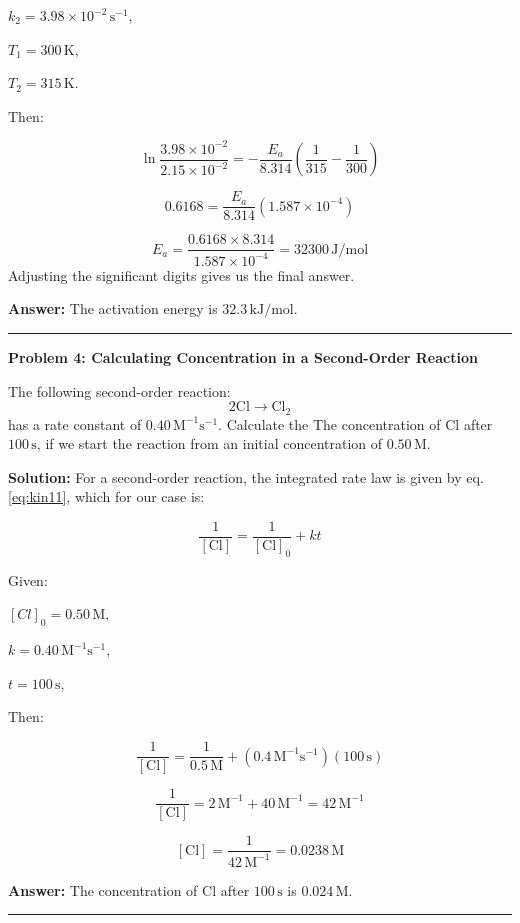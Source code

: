 \documentclass[
  9pt,
]{extbook}
\theoremstyle{definition}
\theoremstyle{definition}
\theoremstyle{definition}
\theoremstyle{remark}
\begin{document}
\(k_2 = 3.98 \times 10^{-2}\,\text{s}^{-1}\),

\(T_1 = 300\,\text{K}\),

\(T_2 = 315\,\text{K}\).

Then:

\[\ln \frac{3.98 \times 10^{-2}}{2.15 \times 10^{-2}} = -\frac{E_a}{8.314}\left(\frac{1}{315} - \frac{1}{300}\right)\]

\[0.6168 = \frac{E_a}{8.314}(1.587 \times 10^{-4})\]

\[E_a = \frac{0.6168 \times 8.314}{1.587 \times 10^{-4}} = 32300\,\text{J/mol}\]
Adjusting the significant digits gives us the final answer.

\textbf{Answer:} The activation energy is \(32.3\,\text{kJ/mol}\).

\begin{center}\rule{0.5\linewidth}{0.5pt}\end{center}

\textbf{Problem 4: Calculating Concentration in a Second-Order Reaction}

The following second-order reaction:
\[2\text{Cl} \rightarrow \text{Cl}_2\]
has a rate constant of \(0.40\,\text{M}^{-1}\text{s}^{-1}\). Calculate the The concentration of \(\text{Cl}\) after \(100\,\text{s}\), if we start the reaction from an initial concentration of \(0.50\,\text{M}\).

\textbf{Solution:} For a second-order reaction, the integrated rate law is given by eq. \eqref{eq:kin11}, which for our case is:

\[\frac{1}{[\text{Cl}]} = \frac{1}{[\text{Cl}]_0} + kt\]

Given:

\([Cl]_0 = 0.50\,\text{M}\),

\(k = 0.40\,\text{M}^{-1}\text{s}^{-1}\),

\(t = 100\,\text{s}\),

Then:

\[\frac{1}{[\text{Cl}]} = \frac{1}{0.5\,\text{M}} + (0.4\,\text{M}^{-1}\text{s}^{-1})(100\,\text{s})\]

\[\frac{1}{[\text{Cl}]} = 2\,\text{M}^{-1} + 40\,\text{M}^{-1} = 42\,\text{M}^{-1}\]

\[[\text{Cl}] = \frac{1}{42\,\text{M}^{-1}} = 0.0238\,\text{M}\]

\textbf{Answer:} The concentration of \(\text{Cl}\) after \(100\,\text{s}\) is \(0.024\,\text{M}\).

\begin{center}\rule{0.5\linewidth}{0.5pt}\end{center}
\end{document}
